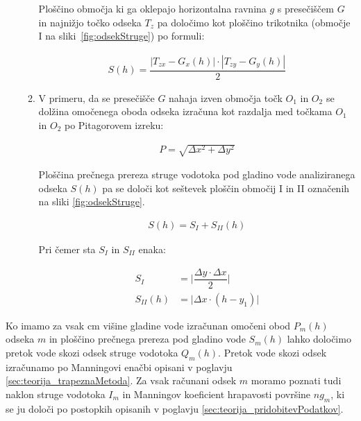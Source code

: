 \begin{enumerate}
\begin{enumerate}
	
	Ploščino območja ki ga oklepajo horizontalna ravnina $g$ s presečiščem $G$ in najnižjo točko odseka $T_z$ pa določimo kot ploščino trikotnika (območje I na sliki~\ref{fig:odsekStruge}) po formuli:
	
	\begin{ceqn}
		\begin{align}
		S(h) = \dfrac{|T_{zx} - G_x(h)| \cdot |T_{zy} - G_y(h)|}{2}
		\end{align}
	\end{ceqn}
	
	
	\item V primeru, da se presečišče $G$ nahaja izven območja točk $O_1$ in $O_2$ se dolžina omočenega oboda odseka izračuna kot razdalja med točkama $O_1$ in $O_2$ po Pitagorovem izreku:
	
	\begin{ceqn}
		\begin{align}
		P = \sqrt{ \Delta x^{2} + \Delta y^{2}}
		\end{align}
	\end{ceqn}
	
	Ploščina prečnega prereza struge vodotoka pod gladino vode analiziranega odseka $S(h)$ pa se določi kot seštevek ploščin območij I in II označenih na sliki \ref{fig:odsekStruge}.
	
	\begin{ceqn}
		\begin{align}
		S(h) = S_I + S_{II}(h)
		\end{align}
	\end{ceqn}
	
	Pri čemer sta $S_I$ in $S_{II}$ enaka:
	
		\begin{ceqn}
			\begin{align}
			S_I&= \bigg|\dfrac{ \Delta y \cdot  \Delta x}{2}\bigg|\\
			S_{II}(h)&= \bigg|\Delta x \cdot (h - y_1)\bigg|
			\end{align}
		\end{ceqn}
		
			
		
	\end{enumerate}

\end{enumerate}



Ko imamo za vsak cm višine gladine vode izračunan omočeni obod $P_m(h)$ odseka $m$ in ploščino prečnega prereza pod gladino vode $S_m(h)$ lahko določimo pretok vode skozi odsek struge vodotoka $Q_m(h)$. Pretok vode skozi odsek izračunamo po Manningovi enačbi opisani v poglavju \ref{sec:teorija_trapeznaMetoda}. Za vsak računani odsek $m$ moramo poznati tudi naklon struge vodotoka $I_m$ in  Manningov koeficient hrapavosti površine $ng_m$, ki se ju določi po postopkih opisanih v poglavju \ref{sec:teorija_pridobitevPodatkov}.


